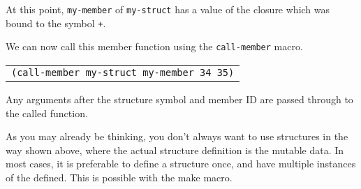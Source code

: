 \documentclass[
letterpaper,
oneside,
]{memoir}
\begin{document}
\noindent
At this point, \texttt{my-member} of \texttt{my-struct} has a value of the closure which was bound to the symbol \texttt{+}.

\filbreak

\vspace{1em}
\noindent
We can now call this member function using the \texttt{call-member} macro.

\vspace{1em}
\begin{tabular}{l}
  \texttt{(call-member my-struct my-member 34 35)} \\
\end{tabular}
\vspace{1em}

\noindent
Any arguments after the structure symbol and member ID are passed through to the called function.

\clearpage

As you may already be thinking, you don’t always want to use structures in the way shown above, where the actual structure definition is the mutable data. In most cases, it is preferable to define a structure once, and have multiple instances of the defined. This is possible with the make macro.
\end{document}
